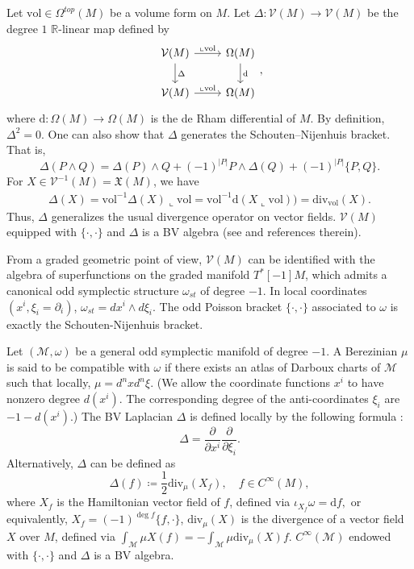 \documentclass[12pt]{amsart}
\numberwithin{table}{section}
\numberwithin{equation}{section}
\theoremstyle{plain}
\newcommand{\R}{\mathbb{R}}
\newcommand{\sM}{\mathcal{M}}
\newcommand{\vol}{\mathrm{vol}}
\newcommand{\dive}{\mathrm{div}}
\newcommand{\MV}{\mathcal{V}}
\begin{document}
Let $\vol \in \Omega^{top}(M)$ be a volume form on $M$. Let $\Delta\colon \MV(M) \rightarrow \MV(M)$ be the degree $1$ $\R$-linear map defined by 
\begin{equation*}
	\begin{tikzcd}
		\MV(M) \arrow[r, "\llcorner \vol"] \arrow[d, "\Delta"] & \Omega(M) \arrow[d, "\mathrm{d}"] \\
		\MV(M) \arrow[r, "\llcorner\vol"]  & \Omega(M)
	\end{tikzcd},
\end{equation*}
where $\mathrm{d} \colon \Omega(M) \rightarrow \Omega(M)$ is the de Rham differential of $M$. By definition, $\Delta^2 = 0$. One can also show that $\Delta$ generates the Schouten--Nijenhuis bracket. That is,
\[
\Delta(P \wedge Q) = \Delta(P) \wedge Q + (-1)^{|P|} P \wedge \Delta(Q) + (-1)^{|P|}\{P,Q\}.
\]
For $X \in \MV^{-1}(M)=\mathfrak{X}(M)$, we have
\begin{align*}
	\Delta(X) = \vol^{-1} \Delta(X) \llcorner \vol = \vol^{-1} \mathrm{d} (X \llcorner \vol)) = \dive_{\vol}(X).
\end{align*}
Thus, $\Delta$ generalizes the usual divergence operator on vector fields. $\MV(M)$ equipped with $\{\cdot, \cdot\}$ and $\Delta$ is a BV algebra (see \cite{cattaneo2018graded} and references therein).

From a graded geometric point of view, $\MV(M)$ can be identified with the algebra of superfunctions on the graded manifold $T^*[-1] M$, which admits a canonical odd symplectic structure $\omega_{st}$ of degree $-1$. In local coordinates $(x^i, \xi_i=\partial_i)$, 
$
\omega_{st} = dx^i \wedge d\xi_i.
$
The odd Poisson bracket $\{\cdot, \cdot\}$ associated to $\omega$ is exactly the Schouten-Nijenhuis bracket. 

Let $(\sM, \omega)$ be a general odd symplectic manifold of degree $-1$. A Berezinian $\mu$ is said to be compatible with $\omega$ if there exists an atlas of Darboux charts of $\mathcal{M}$ such that locally,
$
\mu = d^nx d^n \xi.
$
(We allow the coordinate functions $x^i$ to have nonzero degree $d(x^i)$. The corresponding degree of the anti-coordinates $\xi_i$ are $-1-d(x^i)$.) The BV Laplacian $\Delta$ is defined locally by the following formula \cite{schwarz1993geometry}:
\[
\Delta = \frac{\partial}{\partial x^i}\frac{\partial}{\partial \xi_i}.
\]
Alternatively, $\Delta$ can be defined as
\[
\Delta(f) \coloneqq \frac{1}{2} \dive_{\mu}(X_f), \quad f \in C^{\infty}(M),
\]
where $X_f$ is the Hamiltonian vector field of $f$, defined via
$
\iota_{X_f} \omega = \mathrm{d} f,
$
or equivalently, $X_f=(-1)^{\deg f}\{f, \cdot\}$, $\dive_{\mu}(X)$ is the divergence of a vector field $X$ over $M$, defined via
$
\int_{\sM} \mu X(f) = -\int_{\sM} \mu \dive_{\mu}(X)f.
$
$C^{\infty}(\sM)$ endowed with $\{\cdot,\cdot\}$ and $\Delta$ is a BV algebra.
\end{document}
